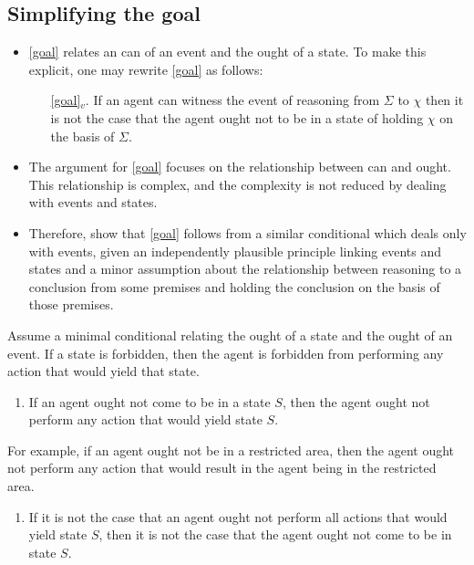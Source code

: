 \documentclass[10pt]{article}
\begin{document}
\subsection{Simplifying the goal}
\label{sec:obtaining-G1}

\begin{itemize}
\item \ref{goal} relates an can of an event and the ought of a state.
  To make this explicit, one may rewrite \ref{goal} as follows:
  \begin{enumerate}[label=G\arabic*., ref=G\arabic*]
  \item[\ref{goal}\(_{v}\).] If an agent can witness the event of reasoning from \(\Sigma\) to \(\chi\) then it is not the case that the agent ought not to be in a state of holding \(\chi\) on the basis of \(\Sigma\).
  \end{enumerate}
\item The argument for \ref{goal} focuses on the relationship between can and ought.
  This relationship is complex, and the complexity is not reduced by dealing with events and states.
\item Therefore, show that \ref{goal} follows from a similar conditional which deals only with events, given an independently plausible principle linking events and states and a minor assumption about the relationship between reasoning to a conclusion from some premises and holding the conclusion on the basis of those premises.
\end{itemize}

Assume a minimal conditional relating the ought of a state and the ought of an event.
If a state is forbidden, then the agent is forbidden from performing any action that would yield that state.

\begin{enumerate}[label=S\arabic*., ref=S\arabic*]
\item\label{event-state-relation} If an agent ought not come to be in a state \(S\), then the agent ought not perform any action that would yield state \(S\).
\end{enumerate}

For example, if an agent ought not be in a restricted area, then the agent ought not perform any action that would result in the agent being in the restricted area.

\begin{enumerate}[label=S\arabic*., ref=S\arabic*, resume]
\item\label{event-state-relation-c} If it is not the case that an agent ought not perform all actions that would yield state \(S\), then it is not the case that the agent ought not come to be in state \(S\).
\end{enumerate}
\end{document}
